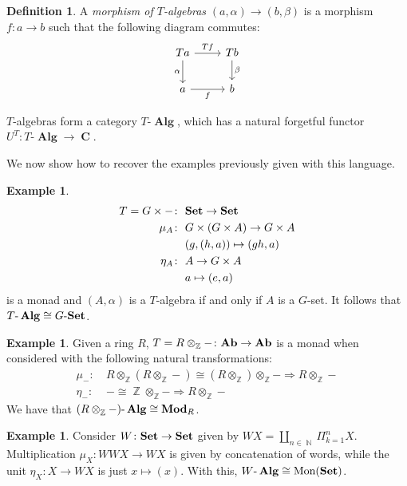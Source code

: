 \documentclass[a4paper,11pt,fullpage,oneside,openany]{amsbook}
\newcommand{\catname}[1]{{\normalfont\textbf{#1}}}
\DeclareMathOperator{\Alg}{\mathbf{Alg}}
\newcommand{\Set}{\catname{Set}}
\newcommand{\Ab}{\catname{Ab}}
\newcommand{\RMod}{\catname{Mod}_R}
\DeclareMathOperator{\C}{\mathbf{C}}
\DeclareMathOperator{\N}{\mathbb{N}}
\DeclareMathOperator{\Z}{\mathbb{Z}}
\theoremstyle{definition}
\theoremstyle{definition}
\newtheorem{defn}[thm]{Definition} %
\newtheorem{exmp}[thm]{Example} %
\theoremstyle{remark}
\begin{document}
	\begin{defn}
		A \emph{morphism of $T$-algebras} $(a,\alpha)\rightarrow (b,\beta)$ is a morphism $f\colon a\rightarrow b$ such that the following diagram commutes:
		\[
			\begin{tikzcd}
				Ta\arrow["\alpha"']{d}\arrow["Tf"]{r}
				& Tb\arrow["\beta"]{d} \\
				a\arrow["f"']{r}
				& b
			\end{tikzcd}
		\]
	\end{defn}

		
	$T$-algebras form a category $T\mbox{-}\Alg$, which has a natural forgetful functor $U^T\colon T\mbox{-}\Alg\rightarrow\C$.
	
	We now show how to recover the examples previously given with this language.
	
	\begin{exmp}
		\begin{align*}
			T=G\times - \colon&\ \Set \rightarrow\Set \\
			\mu_A\colon&\ G\times (G\times A) \rightarrow G\times A \\
			&\ (g,(h,a)) \mapsto (gh,a) \\
			\eta_A\colon&\ A \rightarrow G\times A \\
			&\ a \mapsto (e,a)
		\end{align*}
		is a monad and $(A,\alpha)$ is a $T$-algebra if and only if $A$ is a $G$-set. It follows that $T\mbox{-}\Alg\cong G\mbox{-}\Set$.
	\end{exmp}

	\begin{exmp}
		Given a ring $R$, $T=R\otimes_{\Z}-\colon \Ab\rightarrow \Ab$ is a monad when considered with the following natural transformations:
		\begin{align*}
			\mu_{-}\colon &\ R\otimes_{\Z}(R\otimes_{\Z}-)\cong (R\otimes_{\Z})\otimes_{\Z}-\Rightarrow R\otimes_{\Z}- \\
			\eta_-\colon &\ -\cong\Z\otimes_{\Z}-\Rightarrow R\otimes_{\Z}-
		\end{align*}
	We have that $(R\otimes_{\Z}-)\mbox{-}\Alg\cong \RMod$.
	\end{exmp}

	\begin{exmp}
		Consider $W\colon\Set\rightarrow\Set$ given by $WX=\amalg_{n\in\N}\Pi_{k=1}^n X$. Multiplication $\mu_X\colon WWX\rightarrow WX$ is given by concatenation of words, while the unit $\eta_X\colon X\rightarrow WX$ is just $x\mapsto (x)$. With this, $W\mbox{-}\Alg\cong \text{Mon}(\Set)$.
	\end{exmp}
\end{document}
